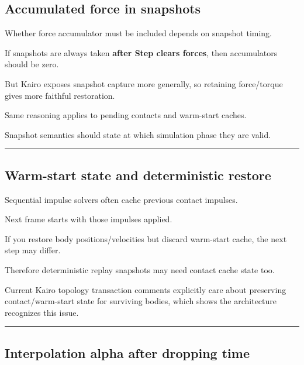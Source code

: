 \subsection{Accumulated force in snapshots}\label{06-engine-ii-ch038-accumulated-force-in-snapshots}

\hypertarget{06-engine-ii-ch038-accumulated-force-in-snapshots}{}

Whether force accumulator must be included depends on snapshot timing.

If snapshots are always taken \textbf{after Step clears forces}, then accumulators should be zero.

But Kairo exposes snapshot capture more generally, so retaining force/torque gives more faithful restoration.

Same reasoning applies to pending contacts and warm-start caches.

Snapshot semantics should state at which simulation phase they are valid.

\begin{center}\rule{0.5\linewidth}{0.5pt}\end{center}

\subsection{Warm-start state and deterministic restore}\label{06-engine-ii-ch038-warm-start-state-and-deterministic-restore}

\hypertarget{06-engine-ii-ch038-warm-start-state-and-deterministic-restore}{}

Sequential impulse solvers often cache previous contact impulses.

Next frame starts with those impulses applied.

If you restore body positions/velocities but discard warm-start cache, the next step may differ.

Therefore deterministic replay snapshots may need contact cache state too.

Current Kairo topology transaction comments explicitly care about preserving contact/warm-start state for surviving bodies, which shows the architecture recognizes this issue.

\begin{center}\rule{0.5\linewidth}{0.5pt}\end{center}

\subsection{Interpolation alpha after dropping time}\label{06-engine-ii-ch038-interpolation-alpha-after-dropping-time}

